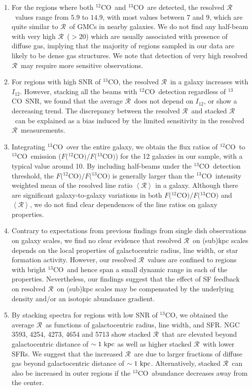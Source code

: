 \documentclass{emulateapj}
\def\ttco{\mbox{$^{13}$CO}}
\def\twco{\mbox{$^{12}$CO}}
\def\rtt{$\mathcal{R}$}
\def\itw{$I_{12}$}
\begin{document}
\begin{enumerate}
\item 
For the regions where both \twco \ and \ttco \ are detected, the resolved \rtt \ values range from $5.9$ to $14.9$, 
with most values between $7$ and $9$, 
which are quite similar to \rtt \ of GMCs in nearby galaxies.  
We do not find any half-beam with very high \rtt \ ($>20$) which are usually 
associated with presence of diffuse gas, 
implying that the majority of regions sampled in our data are 
likely to be dense gas structures.
We note that detection of very high resolved \rtt \  may require more sensitive observations.


\item For regions with high SNR of \ttco, the resolved \rtt \ in a galaxy increases with \itw. 
However, stacking all the beams with \twco \ detection regardless of \ttco \ SNR,  we found that the average \rtt \ does not depend on \itw, or show a decreasing trend. 
The discrepancy between the resolved \rtt \ and stacked \rtt \   can be explained as a bias
induced by the limited sensitivity in the resolved \rtt \ measurements.

\item Integrating \ttco \ over the entire galaxy, we obtain 
the flux ratios of \twco \ to \ttco \ emission ($F($\twco$)/F($\ttco$)$) 
for the 12 galaxies in our sample, with  a typical value around 10. 
By including half-beams under the \ttco \ 
detection threshold, the $F($\twco$)/F($\ttco$)$ is generally larger 
than the \ttco \ intensity weighted mean of the resolved line ratio $\left<\mathcal{R}\right>$ 
in a galaxy.  
Although there are significant galaxy-to-galaxy variations in both 
$F($\twco$)/F($\ttco$)$ and $\left<\mathcal{R}\right>$, 
we do not find clear dependences of the line ratios on galaxy properties.

\item 
Contrary to expectations from 
previous findings from single dish observations on galaxy scales, 
we find no clear evidence that resolved \rtt \ on (sub)kpc scales depends 
on the local properties of galactocentric radius, line width,  or star formation activity.
However, our resolved \rtt \ values are confined to regions with bright \ttco \ and hence span a small dynamic range in each of the properties. 
Nevertheless, our findings suggest that the effect of SF feedback on resolved \rtt \ on (sub)kpc scales 
may be compensated by the underlying density and/or an isotopic abundance gradient. 


\item 
By stacking spectra for regions with low SNR of \ttco, we obtained the average \rtt \ as functions of galactocentric radius, line width, and SFR. NGC 3593, 4254, 4273, 4654 and 5713 show stacked \rtt \ that are elevated beyond  galactocentric distance of $\sim 1 \ \rm kpc$ as well as higher stacked \rtt \  with lower SFRs. We suggest that the increased \rtt \  are due to larger fractions of diffuse gas beyond galactocentric distance of $\sim 1 \ \rm kpc$.  Alternatively, stacked \rtt \ can also be increased  in outer regions if the \ttco \ abundance decreases away from the center. 
 

\end{enumerate}
\end{document}
